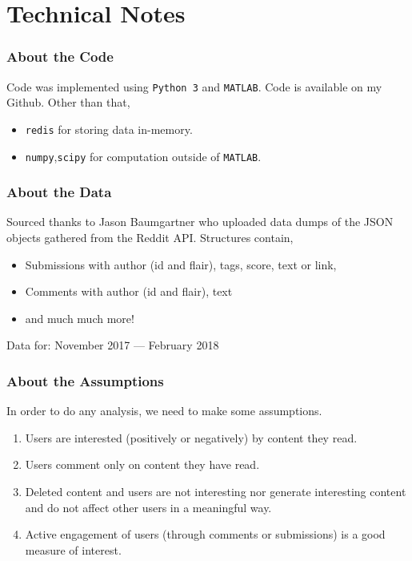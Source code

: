 \documentclass[frame number]{beamer}
\begin{document}
\section{Technical Notes}
\begin{frame}
  \frametitle{About the Code}
  Code was implemented using \texttt{Python 3} and \texttt{MATLAB}. Code is available on my Github. Other than that,
  \begin{itemize}
    \item \texttt{redis} for storing data in-memory.
    \item \texttt{numpy},\texttt{scipy} for computation outside of \texttt{MATLAB}.
  \end{itemize}
\end{frame}
\begin{frame}
  \frametitle{About the Data}
  Sourced thanks to Jason Baumgartner who uploaded data dumps of the JSON objects gathered from the Reddit API. Structures contain,
  \begin{itemize}
    \item{Submissions with author (id and flair), tags, score, text or link,}
    \item{Comments with author (id and flair), text}
    \item{and much much more!}
  \end{itemize}
  \pause
  Data for: November 2017 --- February 2018
\end{frame}
\begin{frame}
  \frametitle{About the Assumptions}
  In order to do any analysis, we need to make some assumptions.
  \begin{enumerate}
    \item<1->{Users are interested (positively or negatively) by content they read.}
    \item<2->{Users comment only on content they have read.}
    \item<3->{Deleted content and users are not interesting nor generate interesting content and do not affect other users in a meaningful way.}
    \item<4->{Active engagement of users (through comments or submissions) is a good measure of interest.}
  \end{enumerate}
\end{frame}
\end{document}
